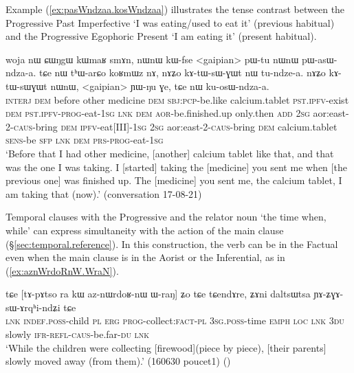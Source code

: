 Example (\ref{ex:pasWndzaa.kosWndzaa}) illustrates the tense contrast between the Progressive Past Imperfective  `I was eating/used to eat it' (previous habitual) and the Progressive Egophoric Present  `I am eating it' (present habitual).

\begin{exe}
\ex \label{ex:pasWndzaa.kosWndzaa}
\gll woja nɯ ɕɯŋgɯ kɯmaʁ smɤn, nɯnɯ kɯ-fse <gaipian> pɯ-tu nɯnɯ pɯ-asɯ-ndza-a. tɕe nɯ tʰɯ-arɕo koʁmɯz nɤ, nɤʑo kɤ-tɯ-sɯ-ɣɯt nɯ tu-ndze-a. nɤʑo kɤ-tɯ-sɯɣɯt nɯnɯ, <gaipian> ɲɯ-ŋu ɣe, tɕe nɯ ku-osɯ-ndza-a. \\
\textsc{interj} \textsc{dem} before other medicine \textsc{dem} \textsc{sbj}:\textsc{pcp}-be.like calcium.tablet \textsc{pst}.\textsc{ipfv}-exist \textsc{dem} \textsc{pst}.\textsc{ipfv}-\textsc{prog}-eat-\textsc{1sg} \textsc{lnk} \textsc{dem} \textsc{aor}-be.finished.up only.then \textsc{add} \textsc{2sg} aor:east-2-\textsc{caus}-bring \textsc{dem} \textsc{ipfv}-eat[III]-\textsc{1sg}  \textsc{2sg} aor:east-2-\textsc{caus}-bring \textsc{dem} calcium.tablet \textsc{sens}-be \textsc{sfp} \textsc{lnk} \textsc{dem} \textsc{prs}-\textsc{prog}-eat-\textsc{1sg} \\
\glt `Before that I had other medicine, [another] calcium tablet like that, and that was the one I was taking. I [started] taking the [medicine] you sent me when [the previous one] was finished up. The [medicine] you sent me, the calcium tablet, I am taking that (now).' (conversation 17-08-21)
\end{exe}

Temporal clauses with the Progressive and the relator noun  `the time when, while' can express simultaneity with the action of the main clause (§\ref{sec:temporal.reference}). In this construction, the verb can be in the Factual even when the main clause is in the Aorist or the Inferential, as in (\ref{ex:aznWrdoRnW.WraN}).

\begin{exe}
\ex \label{ex:aznWrdoRnW.WraN}
\gll tɕe [tɤ-pɤtso ra kɯ az-nɯrdoʁ-nɯ ɯ-raŋ] ʑo tɕe tɕendɤre, ʑɤni daltsɯtsa ɲɤ-ʑɣɤ-sɯ-ɤrqʰi-ndʑi tɕe \\
\textsc{lnk} \textsc{indef}.\textsc{poss}-child \textsc{pl} \textsc{erg} \textsc{prog}-collect:\textsc{fact}-\textsc{pl} \textsc{3sg}.\textsc{poss}-time \textsc{emph} \textsc{loc} \textsc{lnk} \textsc{3du} slowly \textsc{ifr}-\textsc{refl}-\textsc{caus}-be.far-\textsc{du} \textsc{lnk} \\
\glt `While the children were collecting [firewood](piece by piece), [their parents] slowly moved away (from them).' (160630 poucet1)
()
\end{exe}

